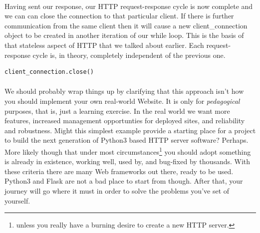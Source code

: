 \paragraph{} Having sent our response, our HTTP request-response cycle is now complete and we can can close the connection to that particular client. If there is further communication from the same client then it will cause a new client\_connection object to be created in another iteration of our while loop. This is the basis of that stateless aspect of HTTP that we talked about earlier. Each request-response cycle is, in theory, completely independent of the previous one.

\begin{lstlisting}[style=CODE]
client_connection.close()
\end{lstlisting}



\paragraph{} We should probably wrap things up by clarifying that this approach isn't how you should implement your own real-world Website. It is only for \emph{pedagogical} purposes, that is, just a learning exercise. In the real world we want more features, increased management opportunties for deployed sites, and reliability and robustness. Might this simplest example provide a starting place for a project to build the next generation of Python3 based HTTP server software? Perhaps. More likely though that under most circumstances\footnote{unless you really have a burning desire to create a new HTTP server.} you should adopt something is already in existence, working well, used by, and bug-fixed by thousands. With these criteria there are many Web frameworks out there, ready to be used. Python3 and Flask are not a bad place to start from though. After that, your journey will go where it must in order to solve the problems you've set of yourself.
